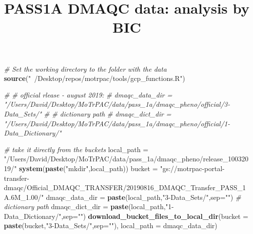 \documentclass[]{article}
\title{PASS1A DMAQC data: analysis by BIC}
\author{}
\date{}
\newenvironment{Shaded}{\begin{snugshade}}{\end{snugshade}}
\newcommand{\KeywordTok}[1]{\textcolor[rgb]{0.13,0.29,0.53}{\textbf{#1}}}
\newcommand{\DataTypeTok}[1]{\textcolor[rgb]{0.13,0.29,0.53}{#1}}
\newcommand{\StringTok}[1]{\textcolor[rgb]{0.31,0.60,0.02}{#1}}
\newcommand{\CommentTok}[1]{\textcolor[rgb]{0.56,0.35,0.01}{\textit{#1}}}
\newcommand{\NormalTok}[1]{#1}
\begin{document}
\maketitle

\begin{Shaded}
\begin{Highlighting}[]
\CommentTok{# Set the working directory to the folder with the data}
\KeywordTok{source}\NormalTok{(}\StringTok{"~/Desktop/repos/motrpac/tools/gcp_functions.R"}\NormalTok{)}

\CommentTok{# # official rlease - august 2019:}
\CommentTok{# dmaqc_data_dir = "/Users/David/Desktop/MoTrPAC/data/pass_1a/dmaqc_pheno/official/3-Data_Sets/"}
\CommentTok{# # dictionary path}
\CommentTok{# dmaqc_dict_dir = "/Users/David/Desktop/MoTrPAC/data/pass_1a/dmaqc_pheno/official/1-Data_Dictionary/"}

\CommentTok{# take it directly from the buckets}
\NormalTok{local_path =}\StringTok{ "/Users/David/Desktop/MoTrPAC/data/pass_1a/dmaqc_pheno/release_10032019/"}
\KeywordTok{system}\NormalTok{(}\KeywordTok{paste}\NormalTok{(}\StringTok{"mkdir"}\NormalTok{,local_path))}
\NormalTok{bucket =}\StringTok{ "gs://motrpac-portal-transfer-dmaqc/Official_DMAQC_TRANSFER/20190816_DMAQC_Transfer_PASS_1A.6M_1.00/"}
\NormalTok{dmaqc_data_dir =}\StringTok{ }\KeywordTok{paste}\NormalTok{(local_path,}\StringTok{"3-Data_Sets/"}\NormalTok{,}\DataTypeTok{sep=}\StringTok{""}\NormalTok{)}
\CommentTok{# dictionary path}
\NormalTok{dmaqc_dict_dir =}\StringTok{ }\KeywordTok{paste}\NormalTok{(local_path,}\StringTok{"1-Data_Dictionary/"}\NormalTok{,}\DataTypeTok{sep=}\StringTok{""}\NormalTok{)}
\KeywordTok{download_bucket_files_to_local_dir}\NormalTok{(}\DataTypeTok{bucket =} \KeywordTok{paste}\NormalTok{(bucket,}\StringTok{"3-Data_Sets/"}\NormalTok{,}\DataTypeTok{sep=}\StringTok{""}\NormalTok{),}
                                   \DataTypeTok{local_path =}\NormalTok{ dmaqc_data_dir)}
\end{Highlighting}
\end{Shaded}
\end{document}
